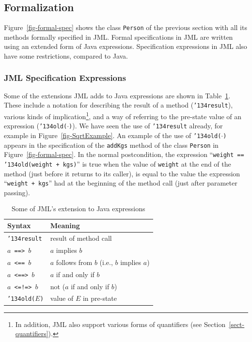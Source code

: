 \documentclass[twocolumn]{article}
\def\RESULT{\texttt{\char'134result}}
\def\OLD#1{\texttt{\char'134old({#1})}}
\begin{document}
\subsection{Formalization}
\label{sect-formalization}

Figure~\ref{fig-formal-spec} shows the class \texttt{Person} of the
previous section with all its methods formally specified in JML.
Formal specifications in JML are written using an extended form of
Java expressions.  Specification expressions in JML also have some
restrictions, compared to Java.

\subsubsection{JML Specification Expressions}

Some of the extensions JML adds to Java expressions
are shown in Table~\ref{tbl-jml-extension}.
These include a notation for describing the result of a method
(\RESULT), various kinds of implication\footnote{In addition, JML
also support various forms of quantifiers
(see Section~\ref{sect-quantifiers}).},
and a way of referring to the pre-state value of an expression
(\OLD{$\cdot$}).
We have seen the use of {\RESULT} already, for example in
Figure~\ref{fig-SqrtExample}.
An example of the use of \OLD{$\cdot$} appears in the specification of
the \texttt{addKgs} method of the class \texttt{Person} in
Figure~\ref{fig-formal-spec}.  In the normal postcondition,
the expression 
``\texttt{weight == \OLD{weight + kgs}}''
is true when the value of \texttt{weight} at the end of the method
(just before it returns to its caller), is equal to the value the expression
``\texttt{weight + kgs}'' had at the beginning of the method call
(just after parameter passing).

\begin{table}
\caption{Some of JML's extension to Java expressions}
\label{tbl-jml-extension}
\begin{center}
\begin{tabular}{|l|l|}\hline
  Syntax& Meaning\\\hline\hline
  {\RESULT} & result of method call\\
  \texttt{$a$ ==> $b$} & $a$ implies $b$\\
  \texttt{$a$ <== $b$} & $a$ follows from $b$ (i.e., $b$ implies $a$) \\
  \texttt{$a$ <==> $b$} & $a$ if and only if $b$\\
  \texttt{$a$ <=!=> $b$} & not ($a$ if and only if $b$)\\
  \OLD{$E$} & value of $E$ in pre-state\\\hline
\end{tabular}
\end{center}
\end{table}
\end{document}
